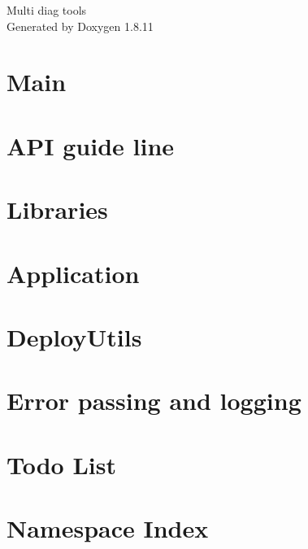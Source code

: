 \documentclass[twoside]{book}
\newcommand{\+}{\discretionary{\mbox{\scriptsize$\hookleftarrow$}}{}{}}
\newcommand{\clearemptydoublepage}{%
  \newpage{\pagestyle{empty}\cleardoublepage}%
}
\begin{document}
\hypersetup{pageanchor=false,
             bookmarksnumbered=true,
             pdfencoding=unicode
            }
\begin{titlepage}
\vspace*{7cm}
\begin{center}%
{\Large Multi diag tools }\\
\vspace*{1cm}
{\large Generated by Doxygen 1.8.11}\\
\end{center}
\end{titlepage}
\clearemptydoublepage
\tableofcontents
\clearemptydoublepage
{}
\hypersetup{pageanchor=true}

\chapter{Main}
\label{index}\hypertarget{index}{}
\chapter{A\+PI guide line}
\label{guideline_page}
\hypertarget{guideline_page}{}

\chapter{Libraries}
\label{libraries_page}
\hypertarget{libraries_page}{}

\chapter{Application}
\label{libs_Application}
\hypertarget{libs_Application}{}

\chapter{Deploy\+Utils}
\label{libs_DeployUtils}
\hypertarget{libs_DeployUtils}{}

\chapter{Error passing and logging}
\label{libs_Error}
\hypertarget{libs_Error}{}

\chapter{Todo List}
\label{todo}
\hypertarget{todo}{}

\chapter{Namespace Index}

\end{document}
